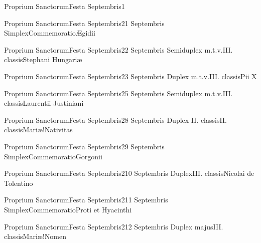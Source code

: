 \documentclass[liber-responsorialis.tex]{subfiles}
\begin{document}
	{Proprium Sanctorum}{Festa Septembris}{1}{}
	{}{}{}{}{}

	{Proprium Sanctorum}{Festa Septembris}{2}{1 Septembris}
	{Simplex}{Commemoratio}{Ægidii}
	{}
	{}
\rubric{\respdetemp}

	{Proprium Sanctorum}{Festa Septembris}{2}{2 Septembris}
	{Semiduplex m.t.v.}{III. classis}{Stephani Hungariæ}
	{\conprubric}
	{\respdetemp}

	{Proprium Sanctorum}{Festa Septembris}{2}{3 Septembris}
	{Duplex m.t.v.}{III. classis}{Pii X}
	{\coporubric}
	{\respdetemp}

	{Proprium Sanctorum}{Festa Septembris}{2}{5 Septembris}
	{Semiduplex m.t.v.}{III. classis}{Laurentii Justiniani}
	{\coporubric}
	{\respdetemp}

	{Proprium Sanctorum}{Festa Septembris}{2}{8 Septembris}
	{Duplex II. classis}{II. classis}{Mariæ!Nativitas}
	{}
	{}

	{Proprium Sanctorum}{Festa Septembris}{2}{9 Septembris}
	{Simplex}{Commemoratio}{Gorgonii}
	{}
	{}
\rubric{\respdetemp}

	{Proprium Sanctorum}{Festa Septembris}{2}{10 Septembris}
	{Duplex}{III. classis}{Nicolai de Tolentino}
	{\conprubric}
	{\respdetemp}

	{Proprium Sanctorum}{Festa Septembris}{2}{11 Septembris}
	{Simplex}{Commemoratio}{Proti et Hyacinthi}
	{}
	{}
\rubric{\respdetemp}

	{Proprium Sanctorum}{Festa Septembris}{2}{12 Septembris}
	{Duplex majus}{III. classis}{Mariæ!Nomen}
	{\cbmvrubric}
	{\respdetemp}
\end{document}
